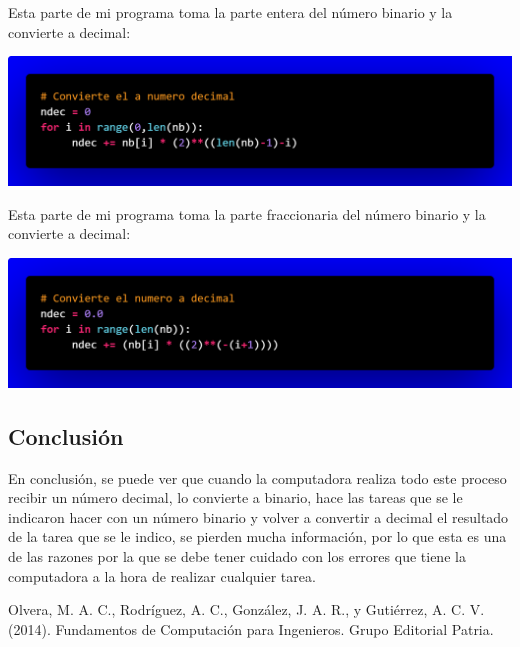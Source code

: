 \documentclass[12pt]{article}
\begin{document}
			\newpage
			Esta parte de mi programa toma la parte entera del número binario y la convierte a decimal:
			\begin{center}
				\includegraphics[width=\linewidth]{Base 2 a Base 10.png} 				
			\end{center}
			Esta parte de mi programa toma la parte fraccionaria del número binario y la convierte a decimal:
			\begin{center}
				\includegraphics[width=\linewidth]{Basef 2 a Basef 10.png} 				
			\end{center}

		\begin{center}
			\section*{Conclusión}\label{sec:Conclusión}
		\end{center}
			En conclusión, se puede ver que cuando la computadora realiza todo este proceso recibir un número 
			decimal, lo convierte a binario, hace las tareas que se le indicaron hacer con un número binario y 
			volver a convertir a decimal el resultado de la tarea que se le indico, se pierden mucha información, 
			por lo que esta es una de las razones por la que se debe tener cuidado con los errores que tiene la 
			computadora a la hora de realizar cualquier tarea.\\

		\centering
		\begin{thebibliography}{10}
			 Olvera, M. A. C., Rodríguez, A. C., González, J. A. R., y Gutiérrez, A. C. V. (2014). Fundamentos de
							Computación para Ingenieros. Grupo Editorial Patria.
			
		\end{thebibliography}

	
\end{document}
